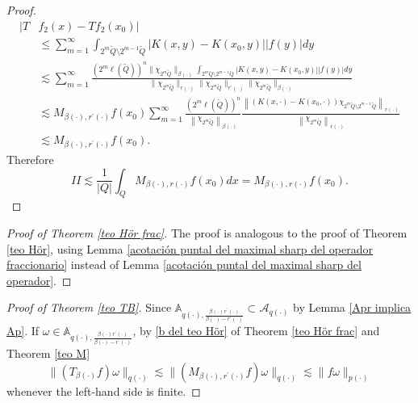 \documentclass[a4paper,11pt,reqno]{amsart}
\theoremstyle{plain}
\numberwithin{equation}{section}
\theoremstyle{definition}
\begin{document}
\begin{proof}
\begin{align*}
	|T&f_2(x)-Tf_2(x_0)|\\
	&\leq\sum_{m=1}^{\infty}\int_{2^m \tilde{Q}\setminus2^{m-1}\tilde{Q}}|K(x,y)-K(x_0,y)||f(y)|dy\\
	&\lesssim \sum_{m=1}^{\infty}\frac{(2^m\ell(\tilde{Q}))^n\|\chi_{2^m\tilde{Q}}\|_{\beta(\cdot)}\int_{2^m \tilde{Q}\setminus2^{m-1}\tilde{Q}}|K(x,y)-K(x_0,y)||f(y)|dy}{\|\chi_{2^m\tilde{Q}}\|_{r(\cdot)}\|\chi_{2^m\tilde{Q}}\|_{r^\prime(\cdot)}\|\chi_{2^m\tilde{Q}}\|_{\beta(\cdot)}}\\
	&\lesssim M_{{\beta(\cdot)},{r^\prime(\cdot)}}f(x_0)\sum_{m=1}^{\infty} \frac{(2^m\ell(\tilde{Q}))^n}{\left\|\chi_{2^m\tilde{Q}}\right\|_{\beta(\cdot)}}\frac{\left\|(K(x,\cdot)-K(x_0,\cdot))\chi_{2^m \tilde{Q}\setminus2^{m-1}\tilde{Q}}\right\|_{r(\cdot)}}{\left\|\chi_{2^m \tilde{Q}}\right\|_{r(\cdot)}}\\
	&\lesssim M_{{\beta(\cdot)},{r^\prime(\cdot)}}f(x_0).
	\end{align*}
 	Therefore
	\begin{equation*}
	II\lesssim \frac{1}{|Q|}\int_QM_{{\beta(\cdot)},{r(\cdot)}}f(x_0)dx=M_{{\beta(\cdot)},{r(\cdot)}}f(x_0).
	\end{equation*}
\end{proof}


\begin{proof}[Proof of Theorem \ref{teo Hör frac}] The proof is analogous to the proof of Theorem \ref{teo Hör}, using Lemma \ref{acotación puntal del maximal sharp del operador fraccionario} instead of Lemma \ref{acotación puntal del maximal sharp del operador}.
\end{proof}
\begin{proof}[Proof of Theorem \ref{teo TB}]
		Since $\mathbb{A}_{q(\cdot),\frac{\beta(\cdot) r^\prime(\cdot)}{\beta(\cdot)-r^\prime(\cdot)}}\subset\mathcal{A}_{q(\cdot)}$ by Lemma \ref{Apr implica Ap}. If $\omega\in\mathbb{A}_{q(\cdot),\frac{\beta(\cdot) r^\prime(\cdot)}{\beta(\cdot)-r^\prime(\cdot)}}$, by \ref{b del teo Hör} of Theorem \ref{teo Hör frac} and Theorem \ref{teo M}
	\begin{equation*}
	\|(T_{\beta(\cdot)}f)\omega\|_{q(\cdot)}\lesssim		\|(M_{\beta(\cdot),r^\prime(\cdot)}f)\omega\|_{q(\cdot)}\lesssim	\|f\omega\|_{p(\cdot)}
	\end{equation*}
	whenever the left-hand side is finite.
\end{proof}
\end{document}
